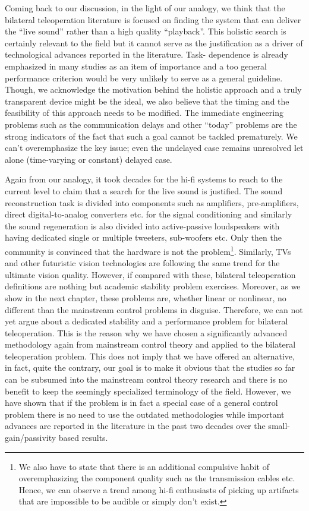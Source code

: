 Coming back to our discussion, in the light of our analogy, we think that the bilateral teleoperation literature is focused on finding
the system that can deliver the \enquote{live sound} rather than a high quality \enquote{playback}. This holistic search is certainly
relevant to the field but it cannot serve as the justification as a driver of technological advances reported in the literature. Task-%
dependence is already emphasized in many studies as an item of importance and a too general performance criterion would be very unlikely
to serve as a general guideline. Though, we acknowledge the motivation behind the holistic approach and a truly transparent device 
might be the ideal, we also believe that the timing and the feasibility of this approach needs to be modified. The immediate engineering 
problems such as the communication delays and other \enquote{today} problems are the strong indicators of the fact that such a goal cannot 
be tackled prematurely. We can't overemphasize the key issue; even the undelayed case remains unresolved let alone (time-varying 
or constant) delayed case. 


Again from our analogy, it took decades for the hi-fi systems to reach to the current level to claim that
a search for the live sound is justified. The sound reconstruction task is divided into components such as amplifiers, pre-amplifiers, 
direct digital-to-analog converters etc. for the signal conditioning and similarly the sound regeneration is also divided into active-passive 
loudspeakers with having dedicated single or multiple tweeters, sub-woofers etc. Only then the community is convinced that the hardware 
is not the problem\footnote{We also
have to state that there is an additional compulsive habit of overemphasizing the component quality such as the transmission cables etc. 
Hence, we can observe a trend among hi-fi enthusiasts of picking up artifacts that are impossible to be audible or simply don't exist.}.
Similarly, TVs and other futuristic vision technologies are following the same trend for the ultimate vision quality. However, if compared 
with these, bilateral teleoperation definitions are nothing but academic stability problem exercises. Moreover, as we show in the next
chapter, these problems are, whether linear or nonlinear, no different than the mainstream control problems in disguise. Therefore, we
can not yet argue about a dedicated stability and a performance problem for bilateral teleoperation. This is the reason why we have 
chosen a significantly advanced methodology again from mainstream control theory and applied to the bilateral teleoperation problem. 
This does not imply that we have offered an alternative, in fact, quite the contrary, our goal is to make it obvious that the studies 
so far can be subsumed into the mainstream control theory research and there is no benefit to keep the seemingly specialized terminology 
of the field. However, we have shown that if the problem is in fact a special case of a general control problem there is no need to use
the outdated methodologies while important advances are reported in the literature in the past two decades over the small-gain/passivity
based results. 



